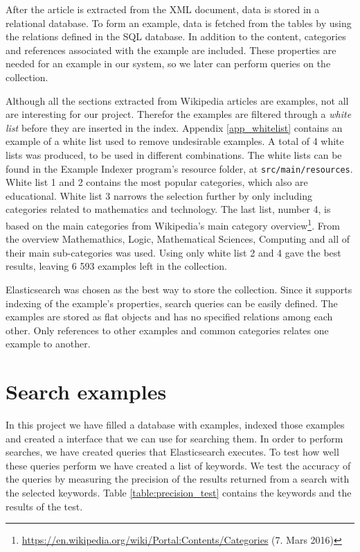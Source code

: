 After the article is extracted from the XML document, data is stored in a relational database. To form an example, data is fetched from the tables by using the relations defined in the SQL database. In addition to the content, categories and references associated with the example are included. These properties are needed for an example in our system, so we later can perform queries on the collection.

Although all the sections extracted from Wikipedia articles are examples, not all are interesting for our project. Therefor the examples are filtered through a \textit{white list} before they are inserted in the index. Appendix \ref{app_whitelist} contains an example of a white list used to remove undesirable examples. A total of 4 white lists was produced, to be used in different combinations. The white lists can be found in the Example Indexer program's resource folder, at \texttt{src/main/resources}. White list 1 and 2 contains the most popular categories, which also are educational. White list 3 narrows the selection further by only including categories related to mathematics and technology. The last list, number 4, is based on the main categories from Wikipedia's main category overview\footnote{\url{https://en.wikipedia.org/wiki/Portal:Contents/Categories} (7. Mars 2016)}. From the overview Mathemathics, Logic, Mathematical Sciences, Computing and all of their main sub-categories was used.
Using only white list 2 and 4 gave the best results, leaving 6 593 examples left in the collection.

Elasticsearch was chosen as the best way to store the collection. Since it supports indexing of the example's properties, search queries can be easily defined. The examples are stored as flat objects and has no specified relations among each other. Only references to other examples and common categories relates one example to another.


\section{Search examples}
In this project we have filled a database with examples, indexed those examples and created a interface that we can use for searching them. In order to perform searches, we have created queries that Elasticsearch executes. To test how well these queries perform we have created a list of keywords. We test the accuracy of the queries by measuring the precision of the results returned from a search with the selected  keywords. Table \ref{table:precision_test} contains the keywords and the results of the test.

